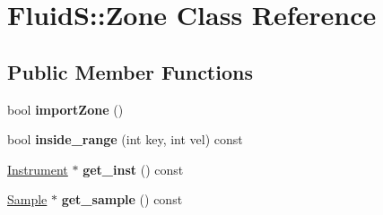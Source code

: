 \hypertarget{class_fluid_s_1_1_zone}{}\section{FluidS\+:\+:Zone Class Reference}
\label{class_fluid_s_1_1_zone}
\subsection*{Public Member Functions}
\begin{DoxyCompactItemize}
\item 
\mbox{\label{class_fluid_s_1_1_zone_a1152335c5ccc8600fb05e5deaef26ec6}} 
bool {\bfseries import\+Zone} ()
\item 
\mbox{\label{class_fluid_s_1_1_zone_aa4d8d37855e17392b57f2998be46492d}} 
bool {\bfseries inside\+\_\+range} (int key, int vel) const
\item 
\mbox{\label{class_fluid_s_1_1_zone_a6d149c2f7123bdef600815e7c3ba13a6}} 
\hyperlink{class_fluid_s_1_1_instrument}{Instrument} $\ast$ {\bfseries get\+\_\+inst} () const
\item 
\mbox{\label{class_fluid_s_1_1_zone_ad9bcc792cd437b74c4ac109dbe82c91e}} 
\hyperlink{class_fluid_s_1_1_sample}{Sample} $\ast$ {\bfseries get\+\_\+sample} () const
\end{DoxyCompactItemize}
